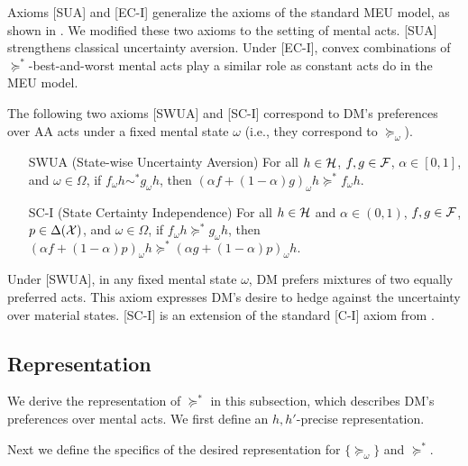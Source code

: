 \documentclass[11pt,oneside]{article}
\theoremstyle{plain}
\theoremstyle{plain}
\theoremstyle{plain}
\theoremstyle{plain}
\theoremstyle{plain}
\theoremstyle{definition}
\theoremstyle{definition}
\theoremstyle{remark}
\theoremstyle{plain}
\newcommand{\F}{{\cal F}}
\newcommand{\pfo}{\pf_\omega}
\newcommand{\mcx}{{\cal X}}
\newcommand{\pf}{\succeq}
\newcommand{\pfs}{\succeq^*}
\newcommand{\convmix}[2]{\alpha #1 + (1-\alpha) #2}
\newcommand{\omix}[2]{#1_\omega #2 }
\begin{document}
Axioms [SUA] and [EC-I] generalize the axioms of the standard MEU model, as shown in \cite{hill2019non}. We modified these two axioms to the setting of mental acts. [SUA] strengthens classical uncertainty aversion. Under [EC-I], convex combinations of $\pfs$-best-and-worst mental acts play a similar role as  constant acts do in the MEU model.

The following two axioms [SWUA] and [SC-I] correspond to DM's preferences over AA acts under a fixed mental state $\omega$ (i.e., they correspond to $\pfo$). 
%
\begin{itemize}
    \item [SWUA] (State-wise Uncertainty Aversion) For all $h \in {\cal H}$, $f,g\in \F$, $\alpha \in [0,1]$, and $\omega \in \Omega$, if $\omix{f}{h}\sim^* \omix{g}{h}$, then $\omix{\left(\convmix{f}{g}\right)}{h} \pfs \omix{f}{h}.$
    \item [SC-I] (State Certainty Independence) For all $h \in {\cal H}$ and $\alpha \in (0,1)$, $f,g\in \F$, $p\in \Delta(\mcx)$, and $\omega \in \Omega$, if $\omix{f}{h} \pfs \omix{g}{h}$, then $\omix{\left(\convmix{f}{p}\right)}{h} \pfs \omix{\left(\convmix{g}{p}\right)}{h}.$ 
\end{itemize}
%

Under [SWUA], in any fixed mental state $\omega$, DM prefers mixtures of two equally preferred acts. This axiom expresses DM's desire to hedge against the uncertainty over material states. [SC-I] is an extension of the standard [C-I] axiom from \cite{gilboa1989maxmin}.


\subsection{Representation}

We derive the representation of $\pfs$ in this subsection, which describes DM's preferences over mental acts. We first define an $h,h'$-precise representation.

Next we define the specifics of the desired representation for $\{\pfo\}$ and $\pfs$.
\end{document}
